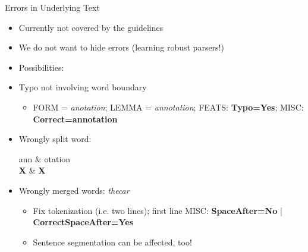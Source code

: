 \documentclass[10pt, compress, aspectratio=169]{beamer}
\newcommand{\upos}[1]{\textbf{\color{blue}#1}}
\newcommand{\feat}[1]{\textbf{\footnotesize\color{red}#1}}
\begin{document}
\begin{frame}{Errors in Underlying Text}
\begin{itemize}
\item Currently not covered by the guidelines
\item We do not want to hide errors (learning robust parsers!)
\item<2-> Possibilities:
\item<2-4> Typo not involving word boundary
  \begin{itemize}
  \item FORM = \textit{anotation}; LEMMA = \textit{annotation}; FEATS: \feat{Typo=Yes}; MISC: \feat{Correct=annotation}
  \end{itemize}
\item<3-4> Wrongly split word: %
\begin{dependency}[label style={thick, font=\bfseries}]
\begin{deptext}[font=\bfseries]
ann \& otation \\
\upos{X} \& \upos{X} \\
\end{deptext}
\end{dependency}
\item<4-4> Wrongly merged words: \textit{thecar}
  \begin{itemize}
  \item Fix tokenization (i.e. two lines); first line MISC: \feat{SpaceAfter=No} | \feat{CorrectSpaceAfter=Yes}
  \item Sentence segmentation can be affected, too!
  \end{itemize}
\end{itemize}
\end{frame}
\end{document}
